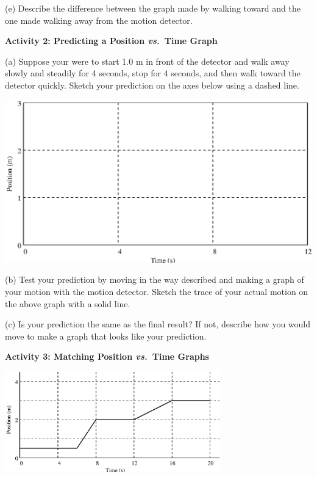 (e) Describe the difference between the graph made by walking toward and the
one made walking away from the motion detector.
\answerspace{20mm}

\textbf{Activity 2: Predicting a Position \textit{vs.}~Time Graph} 

(a) Suppose your were to start 1.0 m in front of the detector and walk away
slowly and steadily for 4 seconds, stop for 4 seconds, and then walk toward
the detector quickly. Sketch your prediction on the axes below using a dashed
line.

\vspace{0.3cm}
{\par\centering \includegraphics{position/position_fig2.eps} \par}
\vspace{0.3cm}

(b) Test your prediction by moving in the way described and making a graph of
your motion with the motion detector. Sketch the trace of your actual motion
on the above graph with a solid line. 

(c) Is your prediction the same as the final result? If not, describe how you
would move to make a graph that looks like your prediction.
\answerspace{20mm}

\pagebreak[2]
\textbf{Activity 3: Matching Position \textit{vs.}~Time Graphs}

{\par\centering \includegraphics[width=0.7\textwidth]{position/position_fig3.eps} \par}
\vspace{-0.1cm}

